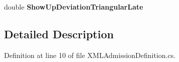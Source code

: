 \begin{DoxyCompactItemize}
\item 
double {\bfseries Show\+Up\+Deviation\+Triangular\+Late}\hypertarget{class_general_health_care_elements_1_1_input_1_1_x_m_l_input_classes_1_1_x_m_l_admission_definition_aed7c6fbeabb74f50555e670861122fcd}{}\label{class_general_health_care_elements_1_1_input_1_1_x_m_l_input_classes_1_1_x_m_l_admission_definition_aed7c6fbeabb74f50555e670861122fcd}

\end{DoxyCompactItemize}


\subsection{Detailed Description}


Definition at line 10 of file X\+M\+L\+Admission\+Definition.\+cs.


